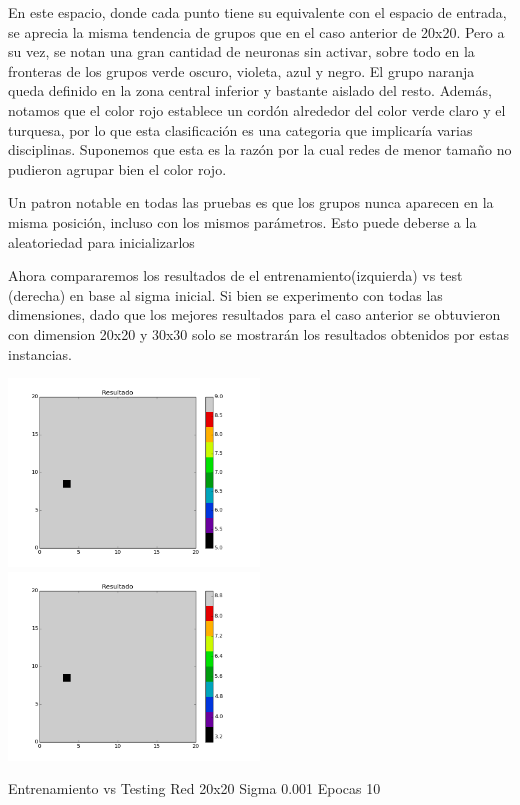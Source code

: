 En este espacio, donde cada punto tiene su equivalente con el espacio de entrada, se aprecia la misma tendencia de grupos que en el caso anterior de 20x20. Pero a su vez, se notan una gran cantidad de neuronas sin activar, sobre todo en la fronteras de los grupos verde oscuro, violeta, azul y negro. El grupo naranja queda definido en la zona central inferior y bastante aislado del resto. Adem\'as, notamos que el color rojo establece un cord\'on alrededor del color verde claro y el turquesa, por lo que esta clasificaci\'on es una categoria que implicar\'ia varias disciplinas. Suponemos que esta es la raz\'on por la cual redes de menor tama\~no no pudieron agrupar bien el color rojo.

Un patron notable en todas las pruebas es que los grupos nunca aparecen en la misma posici\'on, incluso con los mismos par\'ametros. Esto puede deberse a la aleatoriedad para inicializarlos

Ahora compararemos los resultados de el entrenamiento(izquierda) vs test (derecha) en base al sigma inicial. Si bien se experimento con todas las dimensiones, dado que los mejores resultados para el caso anterior se obtuvieron con dimension 20x20 y 30x30 solo se mostrar\'an los resultados obtenidos por estas instancias.


\includegraphics[width=0.5\textwidth]{img/EJ2_Sigma/train_M_20_sigma_0_001_epocas_5}
\includegraphics[width=0.5\textwidth]{img/EJ2_Sigma/test_M_20_sigma_0_001_epocas_5}
{\center \footnotesize Entrenamiento vs Testing Red 20x20 Sigma 0.001 Epocas 10\par}

